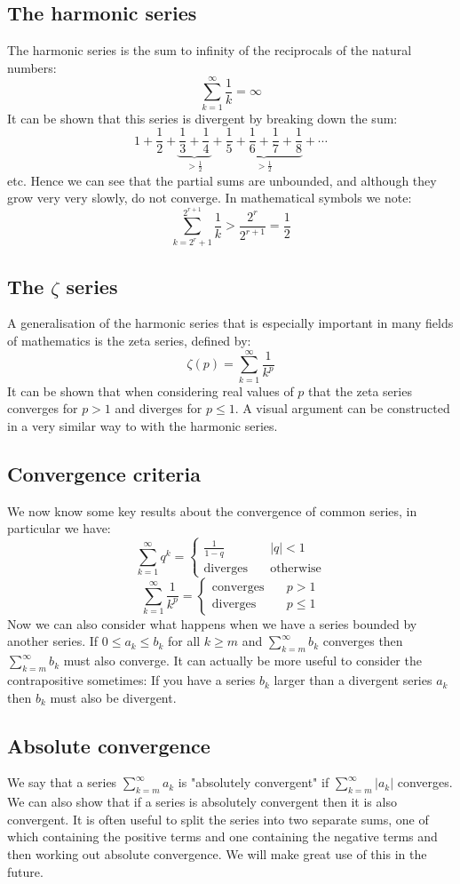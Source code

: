 \documentclass[12pt]{article}
\begin{document}
\subsection*{The harmonic series}
The harmonic series is the sum to infinity of the reciprocals of the natural numbers:
\[\sum^\infty_{k=1}\frac{1}{k}=\infty\]
It can be shown that this series is divergent by breaking down the sum:
\[1+\frac{1}{2}+\underbrace{\frac{1}{3}+\frac{1}{4}}_{>\frac{1}{2}}+\underbrace{\frac{1}{5}+\frac{1}{6}+\frac{1}{7}+\frac{1}{8}}_{>\frac{1}{2}}+\cdots\]
etc. Hence we can see that the partial sums are unbounded, and although they grow very very slowly, do not converge. In mathematical symbols we note:
\[\sum^{2^{r+1}}_{k=2^r+1}\frac{1}{k}>\frac{2^r}{2^{r+1}}=\frac{1}{2}\]
\subsection*{The \(\zeta\) series}
A generalisation of the harmonic series that is especially important in many fields of mathematics is the zeta series, defined by:
\[\zeta(p)=\sum^\infty_{k=1}\frac{1}{k^p}\]
It can be shown that when considering real values of \(p\) that the zeta series converges for \(p>1\) and diverges for \(p\leq 1\). A visual argument can be constructed in a very similar way to with the harmonic series.
\subsection*{Convergence criteria}
We now know some key results about the convergence of common series, in particular we have:
\[\sum^\infty_{k=1}q^k=\begin{cases}
    \frac{1}{1-q}\quad&\vert q\vert <1\\
    \text{diverges}\quad&\text{otherwise}
\end{cases}\]
\[\sum^\infty_{k=1}\frac{1}{k^p}=\begin{cases}
    \text{converges}\quad&p>1\\
    \text{diverges}\quad&p\leq 1
\end{cases}\]
Now we can also consider what happens when we have a series bounded by another series. If \(0\leq a_k\leq b_k\) for all \(k\geq m\) and \(\sum^\infty_{k=m}b_k\) converges then \(\sum^\infty_{k=m}b_k\) must also converge. It can actually be more useful to consider the contrapositive sometimes: If you have a series \(b_k\) larger than a divergent series \(a_k\) then \(b_k\) must also be divergent.
\subsection*{Absolute convergence}
We say that a series \(\sum^\infty_{k=m}a_k\) is "absolutely convergent" if \(\sum^\infty_{k=m}\vert a_k\vert\) converges. We can also show that if a series is absolutely convergent then it is also convergent. It is often useful to split the series into two separate sums, one of which containing the positive terms and one containing the negative terms and then working out absolute convergence. We will make great use of this in the future.
\end{document}
